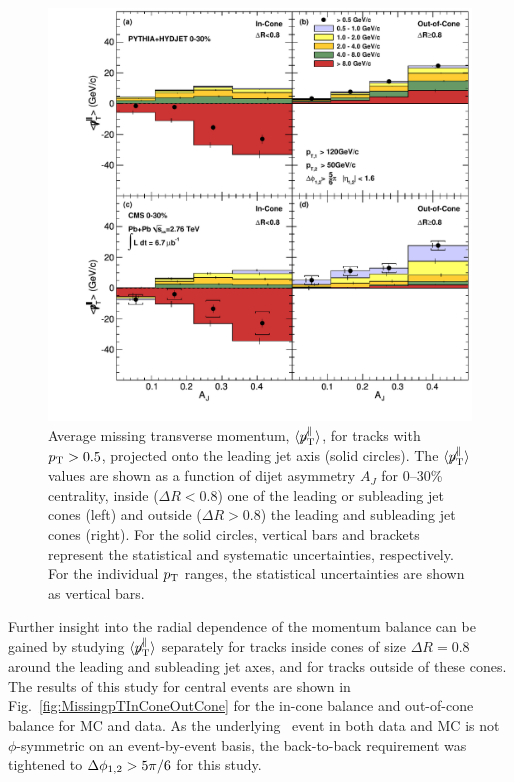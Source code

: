 \begin{figure}[!h]
\begin{center}
\includegraphics[width=0.98\mboxwidth]{jetfigures/missingPtParallel-Corrected-data-InConeOutConeDPhiCut_ntv6_2.pdf}
\caption{Average missing transverse momentum,
$\langle \displaystyle{\not} p_{\mathrm{T}}^{\parallel} \rangle$,
for tracks with $p_{\rm{T}} > 0.5$\GeVc, projected onto the leading jet axis (solid circles).
The $\langle \displaystyle{\not} p_{\mathrm{T}}^{\parallel} \rangle$ values are shown as a function of dijet asymmetry
$A_J$ for 0--30\% centrality, inside ($\Delta R < 0.8$) one of the leading or subleading jet cones (left) and
outside ($\Delta R > 0.8$) the leading and subleading jet cones (right).
For the solid circles, vertical bars and brackets represent
the statistical and systematic uncertainties, respectively.
For the individual $p_{\rm{T}}$ ranges, the statistical uncertainties are shown as vertical bars. }
\label{fig:GR:CMS_missingpT}
\end{center}
\end{figure}

Further insight into the radial dependence of the momentum balance can be gained by studying
$\langle \displaystyle{\not} p_{\mathrm{T}}^{\parallel} \rangle$ separately for tracks inside cones of size $\Delta R = 0.8$
around the leading and subleading jet axes, and for tracks outside of these cones. The results of this study for central events
are shown in Fig.~\ref{fig:MissingpTInConeOutCone} for the in-cone balance and out-of-cone balance for MC and data.
As the underlying \PbPb\ event in both data and MC is not $\phi$-symmetric on an event-by-event basis, the back-to-back requirement
was tightened to $\Delta\phi_{1,2} > 5 \pi/6$ for this study.

